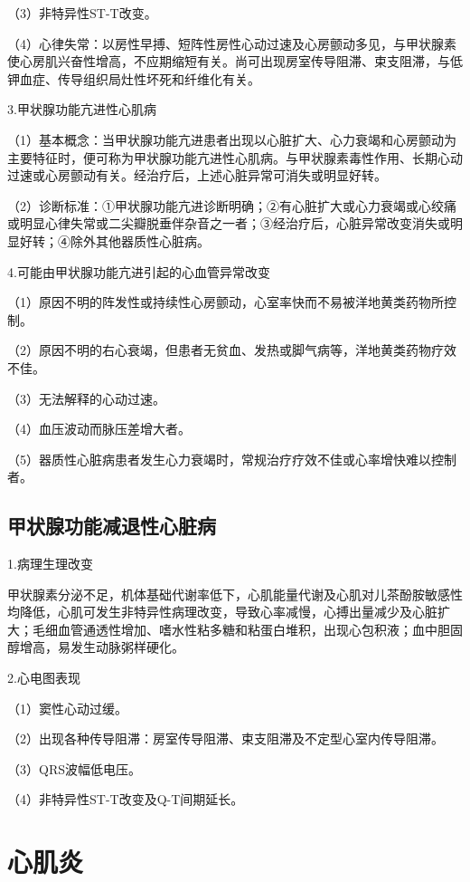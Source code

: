 （3）非特异性ST-T改变。

（4）心律失常：以房性早搏、短阵性房性心动过速及心房颤动多见，与甲状腺素使心房肌兴奋性增高，不应期缩短有关。尚可出现房室传导阻滞、束支阻滞，与低钾血症、传导组织局灶性坏死和纤维化有关。

3.甲状腺功能亢进性心肌病

（1）基本概念：当甲状腺功能亢进患者出现以心脏扩大、心力衰竭和心房颤动为主要特征时，便可称为甲状腺功能亢进性心肌病。与甲状腺素毒性作用、长期心动过速或心房颤动有关。经治疗后，上述心脏异常可消失或明显好转。

（2）诊断标准：①甲状腺功能亢进诊断明确；②有心脏扩大或心力衰竭或心绞痛或明显心律失常或二尖瓣脱垂伴杂音之一者；③经治疗后，心脏异常改变消失或明显好转；④除外其他器质性心脏病。

4.可能由甲状腺功能亢进引起的心血管异常改变

（1）原因不明的阵发性或持续性心房颤动，心室率快而不易被洋地黄类药物所控制。

（2）原因不明的右心衰竭，但患者无贫血、发热或脚气病等，洋地黄类药物疗效不佳。

（3）无法解释的心动过速。

（4）血压波动而脉压差增大者。

（5）器质性心脏病患者发生心力衰竭时，常规治疗疗效不佳或心率增快难以控制者。

\protect\hypertarget{text00050.htmlux5cux23subid608}{}{}

\subsection{甲状腺功能减退性心脏病}

1.病理生理改变

甲状腺素分泌不足，机体基础代谢率低下，心肌能量代谢及心肌对儿茶酚胺敏感性均降低，心肌可发生非特异性病理改变，导致心率减慢，心搏出量减少及心脏扩大；毛细血管通透性增加、嗜水性粘多糖和粘蛋白堆积，出现心包积液；血中胆固醇增高，易发生动脉粥样硬化。

2.心电图表现

（1）窦性心动过缓。

（2）出现各种传导阻滞：房室传导阻滞、束支阻滞及不定型心室内传导阻滞。

（3）QRS波幅低电压。

（4）非特异性ST-T改变及Q-T间期延长。

\protect\hypertarget{text00050.htmlux5cux23subid609}{}{}

\section{心肌炎}

